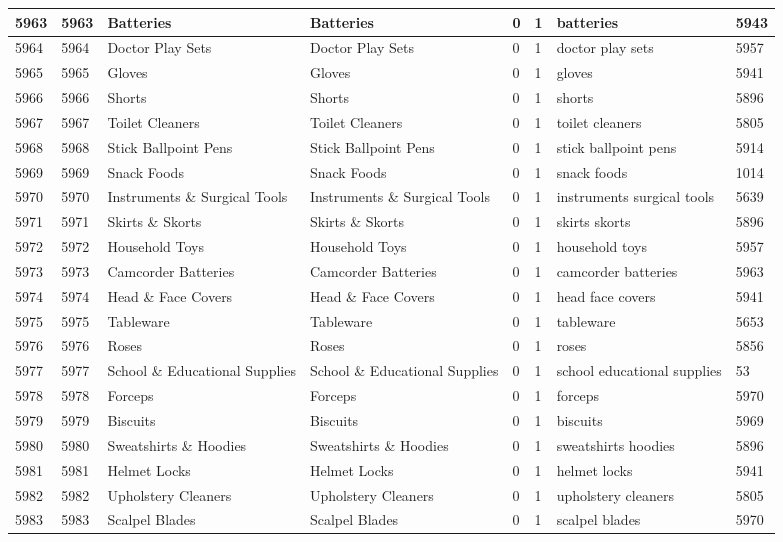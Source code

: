 \begin{longtable}{|l|l|l|l|l|l|l|l|}
5963 & 5963 & Batteries & Batteries & 0 & 1 & batteries & 5943 \\ \hline 
5964 & 5964 & Doctor Play Sets & Doctor Play Sets & 0 & 1 & doctor play sets & 5957 \\ \hline 
5965 & 5965 & Gloves & Gloves & 0 & 1 & gloves & 5941 \\ \hline 
5966 & 5966 & Shorts & Shorts & 0 & 1 & shorts & 5896 \\ \hline 
5967 & 5967 & Toilet Cleaners & Toilet Cleaners & 0 & 1 & toilet cleaners & 5805 \\ \hline 
5968 & 5968 & Stick Ballpoint Pens & Stick Ballpoint Pens & 0 & 1 & stick ballpoint pens & 5914 \\ \hline 
5969 & 5969 & Snack Foods & Snack Foods & 0 & 1 & snack foods & 1014 \\ \hline 
5970 & 5970 & Instruments \& Surgical Tools & Instruments \& Surgical Tools & 0 & 1 & instruments surgical tools & 5639 \\ \hline 
5971 & 5971 & Skirts \& Skorts & Skirts \& Skorts & 0 & 1 & skirts skorts & 5896 \\ \hline 
5972 & 5972 & Household Toys & Household Toys & 0 & 1 & household toys & 5957 \\ \hline 
5973 & 5973 & Camcorder Batteries & Camcorder Batteries & 0 & 1 & camcorder batteries & 5963 \\ \hline 
5974 & 5974 & Head \& Face Covers & Head \& Face Covers & 0 & 1 & head face covers & 5941 \\ \hline 
5975 & 5975 & Tableware & Tableware & 0 & 1 & tableware & 5653 \\ \hline 
5976 & 5976 & Roses & Roses & 0 & 1 & roses & 5856 \\ \hline 
5977 & 5977 & School \& Educational Supplies & School \& Educational Supplies & 0 & 1 & school educational supplies & 53 \\ \hline 
5978 & 5978 & Forceps & Forceps & 0 & 1 & forceps & 5970 \\ \hline 
5979 & 5979 & Biscuits & Biscuits & 0 & 1 & biscuits & 5969 \\ \hline 
5980 & 5980 & Sweatshirts \& Hoodies & Sweatshirts \& Hoodies & 0 & 1 & sweatshirts hoodies & 5896 \\ \hline 
5981 & 5981 & Helmet Locks & Helmet Locks & 0 & 1 & helmet locks & 5941 \\ \hline 
5982 & 5982 & Upholstery Cleaners & Upholstery Cleaners & 0 & 1 & upholstery cleaners & 5805 \\ \hline 
5983 & 5983 & Scalpel Blades & Scalpel Blades & 0 & 1 & scalpel blades & 5970 \\ \hline 

\end{longtable}
